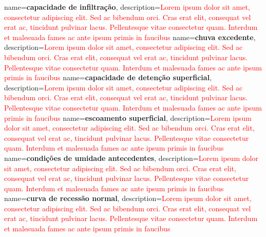 {
    name=\textbf{capacidade de infiltração},
    description={\textcolor{red}{Lorem ipsum dolor sit amet, consectetur adipiscing elit. Sed ac bibendum orci. Cras erat elit, consequat vel erat ac, tincidunt pulvinar lacus. Pellentesque vitae consectetur quam. Interdum et malesuada fames ac ante ipsum primis in faucibus}}
}
{
    name=\textbf{chuva excedente},
    description={\textcolor{red}{Lorem ipsum dolor sit amet, consectetur adipiscing elit. Sed ac bibendum orci. Cras erat elit, consequat vel erat ac, tincidunt pulvinar lacus. Pellentesque vitae consectetur quam. Interdum et malesuada fames ac ante ipsum primis in faucibus}}
}
{
    name=\textbf{capacidade de detenção superficial},
    description={\textcolor{red}{Lorem ipsum dolor sit amet, consectetur adipiscing elit. Sed ac bibendum orci. Cras erat elit, consequat vel erat ac, tincidunt pulvinar lacus. Pellentesque vitae consectetur quam. Interdum et malesuada fames ac ante ipsum primis in faucibus}}
}
{
    name=\textbf{escoamento superficial},
    description={\textcolor{red}{Lorem ipsum dolor sit amet, consectetur adipiscing elit. Sed ac bibendum orci. Cras erat elit, consequat vel erat ac, tincidunt pulvinar lacus. Pellentesque vitae consectetur quam. Interdum et malesuada fames ac ante ipsum primis in faucibus}}
}
{
    name=\textbf{condições de umidade antecedentes},
    description={\textcolor{red}{Lorem ipsum dolor sit amet, consectetur adipiscing elit. Sed ac bibendum orci. Cras erat elit, consequat vel erat ac, tincidunt pulvinar lacus. Pellentesque vitae consectetur quam. Interdum et malesuada fames ac ante ipsum primis in faucibus}}
}
{
    name=\textbf{curva de recessão normal},
    description={\textcolor{red}{Lorem ipsum dolor sit amet, consectetur adipiscing elit. Sed ac bibendum orci. Cras erat elit, consequat vel erat ac, tincidunt pulvinar lacus. Pellentesque vitae consectetur quam. Interdum et malesuada fames ac ante ipsum primis in faucibus}}
}